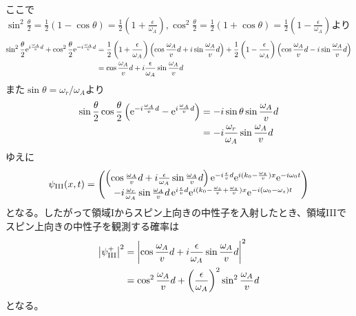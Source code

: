 ここで$\sin^2 \frac{\theta}{2}=\frac{1}{2}(1-\cos \theta) =\frac{1}{2} (1+\frac{\epsilon}{\omega_A}),\cos^2\frac{\theta}{2}=\frac{1}{2} (1+\cos\theta) =\frac{1}{2} (1-\frac{\epsilon}{\omega_A})$より
\begin{align}
\sin^2 \frac{\theta}{2} \mathrm{e}^{i\frac{\omega_A}{v}d} +\cos^2 \frac{\theta}{2} \mathrm{e}^{-i\frac{\omega_A}{v}d} &= \frac{1}{2} \left(1+\frac{\epsilon}{\omega_A}\right) \left(\cos \frac{\omega_A}{v}d+i\sin \frac{\omega_A}{v}d \right)+\frac{1}{2} \left(1-\frac{\epsilon}{\omega_A}\right) \left(\cos \frac{\omega_A}{v}d-i\sin \frac{\omega_A}{v}d \right) \notag \\
&=\cos \frac{\omega_A}{v}d +i\frac{\epsilon}{\omega_A} \sin \frac{\omega_A}{v}d
\end{align}
また$\sin\theta=\omega_r/\omega_A$より
\begin{align}
\sin\frac{\theta}{2}\cos\frac{\theta}{2} \left(\mathrm{e}^{-i\frac{\omega_A}{v}d}-\mathrm{e}^{i\frac{\omega_A}{v}d}\right) &=-i \sin \theta \sin \frac{\omega_A}{v}d \notag \\
&= -i \frac{\omega_r}{\omega_A} \sin \frac{\omega_A}{v}d
\end{align}
ゆえに
\begin{align}
\psi_\mathrm{III}(x,t)=\begin{pmatrix} \left(\cos \frac{\omega_A}{v}d +i\frac{\epsilon}{\omega_A} \sin \frac{\omega_A}{v}d\right) \mathrm{e}^{-i\frac{\epsilon}{v} d} \mathrm{e}^{i(k_0-\frac{\omega_z}{v})x}\mathrm{e}^{-i\omega_0t} \\ -i \frac{\omega_r}{\omega_A} \sin \frac{\omega_A}{v}d  \, \mathrm{e}^{i\frac{\epsilon}{v}d} \mathrm{e}^{i(k_0-\frac{\omega_s}{v}+\frac{\omega_z}{v})x}\mathrm{e}^{-i(\omega_0-\omega_s)t} \end{pmatrix}
\end{align}
となる。したがって領域Iからスピン上向きの中性子を入射したとき、領域IIIでスピン上向きの中性子を観測する確率は
\begin{align}
\bigl|\psi_\mathrm{III}^+\bigr|^2 &=\biggl |\cos \frac{\omega_A}{v}d +i\frac{\epsilon}{\omega_A} \sin \frac{\omega_A}{v}d\biggr|^2 \notag \\
&=\cos^2 \frac{\omega_A}{v}d+\left(\frac{\epsilon}{\omega_A}\right)^2\sin^2\frac{\omega_A}{v}d
\end{align} \label{Resonance_1-reversal}
となる。

